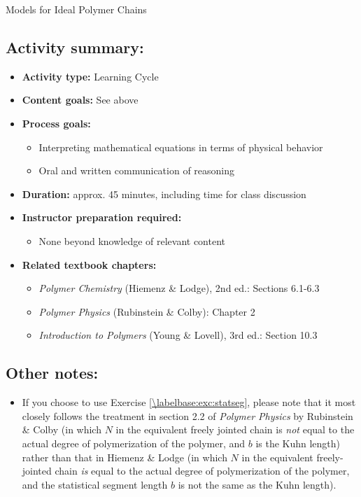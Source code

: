 \begin{activity}{Models for Ideal Polymer Chains}
\begin{instructornotes}
	\subsection*{Activity summary:}
	\begin{itemize}
		\item \textbf{Activity type:} Learning Cycle
		\item \textbf{Content goals:} See above
		\item \textbf{Process goals:} %
			\begin{itemize}
				\item Interpreting mathematical equations in terms of physical behavior
				\item Oral and written communication of reasoning
			\end{itemize}
		\item \textbf{Duration:} approx. 45 minutes, including time for class discussion
		\item \textbf{Instructor preparation required:} 
			\begin{itemize}
				\item None beyond knowledge of relevant content
			\end{itemize}
		\item \textbf{Related textbook chapters:}
			\begin{itemize}
				\item \emph{Polymer Chemistry} (Hiemenz \& Lodge), 2nd ed.: Sections 6.1-6.3
				\item \emph{Polymer Physics} (Rubinstein \& Colby): Chapter 2
				\item \emph{Introduction to Polymers} (Young \& Lovell), 3rd ed.: Section 10.3
			\end{itemize}
	\end{itemize}
	
	\subsection*{Other notes:}
	
		\begin{itemize}
		\item If you choose to use Exercise \ref{\labelbase:exc:statseg}, please note that it most closely follows the treatment in section 2.2 of \emph{Polymer Physics} by Rubinstein \& Colby (in which $N$ in the equivalent freely jointed chain is \emph{not} equal to the actual degree of polymerization of the polymer, and $b$ is the Kuhn length) rather than that in Hiemenz \& Lodge (in which $N$ in the equivalent freely-jointed chain \emph{is} equal to the actual degree of polymerization of the polymer, and the statistical segment length $b$ is not the same as the Kuhn length).
		\end{itemize}


\end{instructornotes}
\end{activity}
